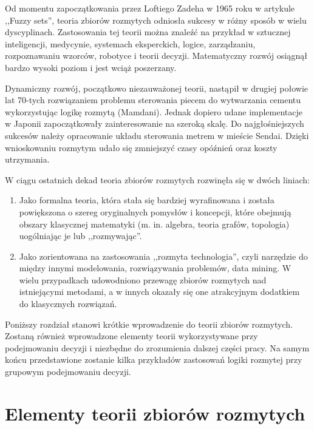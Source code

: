 Od momentu zapoczątkowania przez Loftiego Zadeha w 1965 roku w artykule ,,Fuzzy
sets'', teoria zbiorów rozmytych odniosła sukcesy w różny sposób w wielu
dyscyplinach. Zastosowania tej teorii można znaleźć na przykład w sztucznej 
inteligencji, medycynie, systemach eksperckich, logice, zarządzaniu, 
rozpoznawaniu wzorców, robotyce i teorii decyzji. Matematyczny rozwój osiągnął 
bardzo wysoki poziom i jest wciąż poszerzany.

Dynamiczny rozwój, początkowo niezauważonej teorii, nastąpił w drugiej połowie 
lat 70-tych rozwiązaniem problemu sterowania piecem do wytwarzania cementu 
wykorzystując logikę rozmytą (Mamdani). Jednak dopiero udane implementacje w 
Japonii zapoczątkowały zainteresowanie na szeroką skalę. Do najgłośniejszych 
sukcesów należy opracowanie układu sterowania metrem w mieście Sendai. Dzięki 
wnioskowaniu rozmytym udało się zmniejszyć czasy opóźnień oraz koszty utrzymania.

W ciągu ostatnich dekad teoria zbiorów rozmytych rozwinęła się w dwóch liniach:
\begin{enumerate}[1)]
  
  \item Jako formalna teoria, która stała się bardziej wyrafinowana i została 
  powiększona o szereg oryginalnych pomysłów i koncepcji, które obejmują obszary 
  klasycznej matematyki (m. in. algebra, teoria grafów, topologia) uogólniając
  je lub ,,rozmywając''.
  
  \item Jako zorientowana na zastosowania ,,rozmyta technologia'', czyli
  narzędzie do między innymi modelowania, rozwiązywania problemów, data mining. 
  W wielu przypadkach udowodniono przewagę zbiorów rozmytych nad istniejącymi 
  metodami, a w innych okazały się one atrakcyjnym dodatkiem do klasycznych 
  rozwiązań.

\end{enumerate}

Poniższy rozdział stanowi krótkie wprowadzenie do teorii zbiorów rozmytych. 
Zostaną również wprowadzone elementy teorii wykorzystywane przy podejmowaniu 
decyzji i niezbędne do zrozumienia dalszej części pracy. Na samym końcu 
przedstawione zostanie kilka przykładów zastosowań logiki rozmytej przy 
grupowym podejmowaniu decyzji.

\section{Elementy teorii zbiorów rozmytych}

